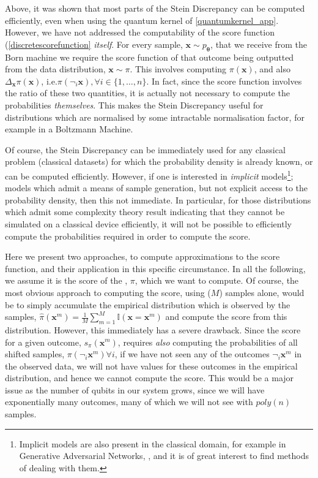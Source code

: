 Above, it was shown that most parts of the Stein Discrepancy can be computed efficiently, even when using the quantum kernel of \eqref{quantumkernel_app}. However, we have not addressed the computability of the score function (\eqref{discretescorefunction} \textit{itself}. For every sample, $\mathbf{x}\sim p_{\boldsymbol\theta}$, that we receive from the Born machine we require the score function of that outcome being outputted from the data distribution, $\mathbf{x} \sim \pi$. This involves computing $\pi(\mathbf{x})$, and also $\Delta_{\mathbf{x}}\pi(\mathbf{x})$, i.e.\@ $\pi(\neg_i\mathbf{x}), \forall i \in\{1, \dots, n\}$. In fact, since the score function involves the ratio of these two quantities, it is actually not necessary to compute the probabilities \textit{themselves}. This makes the Stein Discrepancy useful for distributions which are normalised by some intractable normalisation factor, for example in a Boltzmann Machine. 

Of course, the Stein Discrepancy can be immediately used for any classical problem (classical datasets) for which the probability density is already known, or can be computed efficiently. However, if one is interested in \textit{implicit} models\footnote{Implicit models are also present in the classical domain, for example in Generative Adversarial Networks, , and it is of great interest to find methods of dealing with them.}; models which admit a means of sample generation, but not explicit access to the probability density, then this not immediate. In particular, for those distributions which admit some complexity theory result indicating that they cannot be simulated on a classical device efficiently, it will not be possible to efficiently compute the probabilities required in order to compute the score.

Here we present two approaches, to compute approximations to the score function, and their application in this specific circumstance. In all the following, we assume it is the score of the , $\pi$, which we want to compute. Of course, the most obvious approach to computing the score, using ($M$) samples alone, would be to simply accumulate the empirical distribution which is observed by the samples, $\hat{\pi}(\mathbf{x}^m) = \frac{1}{M}\sum_{m = 1}^M\mathbb{I}(\mathbf{x} = \mathbf{x}^m)$ and compute the score from this distribution. However, this immediately has a severe drawback. Since the score for a given outcome, $s_{\pi}(\mathbf{x}^m)$, requires \textit{also} computing the probabilities of all shifted samples, $\pi(\neg_i\mathbf{x}^m) \forall i$, if we have not seen any of the outcomes $\neg_i\mathbf{x}^m$ in the observed data, we will not have values for these outcomes in the empirical distribution, and hence we cannot compute the score. This would be a major issue as the number of qubits in our system grows, since we will have exponentially many outcomes, many of which we will not see with $poly(n)$ samples.

